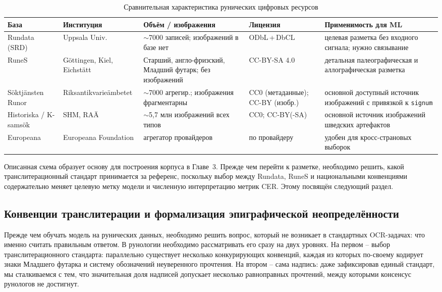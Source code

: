 \documentclass[a4paper,12pt]{extarticle}
\begin{document}
\begin{table}[htbp]
\centering
\caption{Сравнительная характеристика рунических цифровых ресурсов}
\label{tab:digital-resources}
\footnotesize
\begin{tabular}{p{2.0cm} p{2.3cm} p{2.4cm} p{2.4cm} p{3.2cm}}
\hline
\textbf{База} & \textbf{Институция} & \textbf{Объём / изображения} & \textbf{Лицензия} & \textbf{Применимость для ML} \\
\hline
Rundata (SRD) & Uppsala Univ. & $\sim$7000 записей; изображений в базе нет & ODbL\,+\,DbCL & целевая разметка без входного сигнала; нужно связывание \\
RuneS & Göttingen, Kiel, Eichstätt & Старший, англо-фризский, Младший футарк; без изображений & CC-BY-SA 4.0 & детальная палеографическая и аллографическая разметка \\
Söktjänsten Runor & Riks\-antikvarie\-ämbetet & $\sim$7000 агрегир.; изображения фрагментарны & CC0 (метаданные); CC-BY (изобр.) & основной доступный источник изображений с привязкой к \texttt{signum} \\
Historiska / K-samsök & SHM, RAÄ & $\sim$5,7 млн изображений всех типов & CC0; CC-BY(-SA) & основной источник изображений шведских артефактов \\
Europeana & Europeana Foundation & агрегатор провайдеров & по провайдеру & удобен для кросс-страновых выборок \\
\hline
\end{tabular}
\end{table}

Описанная схема образует основу для построения корпуса в Главе~3. Прежде чем перейти к разметке, необходимо решить, какой транслитерационный стандарт принимается за референс, поскольку выбор между Rundata, RuneS и национальными конвенциями содержательно меняет целевую метку модели и численную интерпретацию метрик CER. Этому посвящён следующий раздел.

\subsection{Конвенции транслитерации и формализация эпиграфической неопределённости}
\label{sec:transliteration}

Прежде чем обучать модель на рунических данных, необходимо решить вопрос, 
который не возникает в стандартных OCR-задачах: что именно 
считать правильным ответом. В рунологии необходимо рассматривать его сразу на двух уровнях. На первом -- выбор транслитерационного 
стандарта: параллельно существует несколько конкурирующих конвенций, 
каждая из которых по-своему кодирует знаки Младшего футарка 
и систему обозначений неуверенного прочтения. На втором -- сама надпись: 
даже зафиксировав единый стандарт, мы сталкиваемся с тем, что значительная 
доля надписей допускает несколько равноправных прочтений, между которыми 
консенсус рунологов не достигнут.
\end{document}
